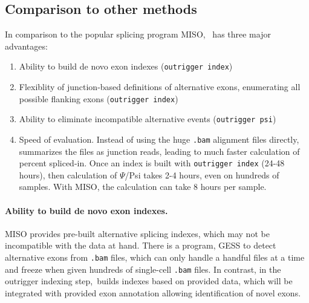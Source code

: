 

\subsection{Comparison to other methods}

In comparison to the popular splicing program MISO\cite{Katz:2010iv}, \outrigger\, has three major advantages:

\begin{enumerate}
	\item Ability to build de novo exon indexes (\texttt{outrigger index})
	\item Flexiblity of junction-based definitions of alternative exons, enumerating all possible flanking exons (\texttt{outrigger index})
	\item Ability to eliminate incompatible alternative events (\texttt{outrigger psi})
	\item Speed of evaluation. Instead of using the huge \texttt{.bam} alignment files directly, \outrigger\, summarizes the files as junction reads, leading to much faster calculation of percent spliced-in. Once an index is built with \texttt{outrigger index} (24-48 hours), then calculation of $\Psi$/Psi takes 2-4 hours, even on hundreds of samples. With MISO, the calculation can take 8 hours per sample.
\end{enumerate}


\paragraph{Ability to build de novo exon indexes.} MISO provides pre-built alternative splicing indexes, which may not be incompatible with the data at hand. There is a program, GESS\cite{Ye:2014cd} to detect alternative exons from \texttt{.bam} files, which can only handle a handful files at a time and freeze when given hundreds of single-cell \texttt{.bam} files. In contrast, in the outrigger indexing step, \outrigger\,builds indexes based on provided data, which will be integrated with provided exon annotation allowing identification of novel exons.

